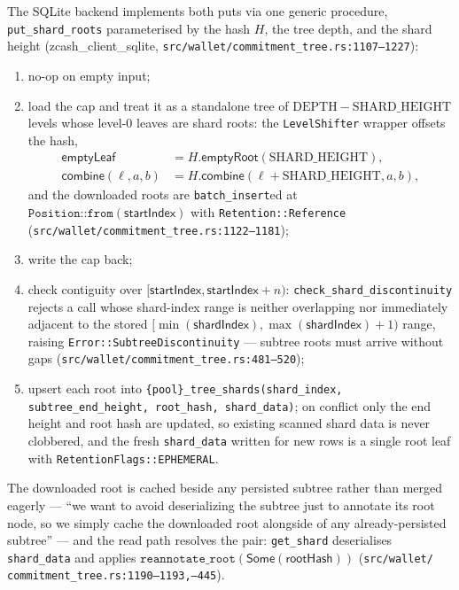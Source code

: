 \documentclass[11pt,a4paper]{article}
\theoremstyle{definition}
\begin{document}
The SQLite backend implements both puts via one generic procedure,
\texttt{put\_shard\_roots} parameterised by the hash $H$, the tree
depth, and the shard height
(\textsf{zcash\_client\_sqlite},
\texttt{src/wallet/}\allowbreak\texttt{commitment\_tree.rs:1107--1227}):
\begin{enumerate}[label=(\arabic*)]
\item no-op on empty input;
\item load the cap and treat it as a standalone tree of
  $\mathrm{DEPTH} - \mathrm{SHARD\_HEIGHT}$ levels whose level-$0$ leaves
  are shard roots: the \texttt{LevelShifter} wrapper offsets the hash,
  \[
  \begin{aligned}
  \mathsf{emptyLeaf} &= H.\mathsf{emptyRoot}(\mathrm{SHARD\_HEIGHT}), \\
  \mathsf{combine}(\ell, a, b) &=
    H.\mathsf{combine}(\ell + \mathrm{SHARD\_HEIGHT}, a, b),
  \end{aligned}
  \]
  and the downloaded roots are \texttt{batch\_insert}ed at
  $\texttt{Position::from}(\mathsf{startIndex})$ with
  \texttt{Retention::Reference}
  (\texttt{src/wallet/}\allowbreak\texttt{commitment\_tree.rs:1122--1181});
\item write the cap back;
\item check contiguity over
  $[\mathsf{startIndex}, \mathsf{startIndex} + n)$:
  \texttt{check\_shard\_discontinuity} rejects a call whose shard-index
  range is neither overlapping nor immediately adjacent to the stored
  $[\min(\mathsf{shardIndex}), \max(\mathsf{shardIndex}) + 1)$ range,
  raising \texttt{Error::SubtreeDiscontinuity} --- subtree roots must
  arrive without gaps
  (\texttt{src/wallet/}\allowbreak\texttt{commitment\_tree.rs:481--520});
\item upsert each root into
  \texttt{\{pool\}\_tree\_shards(shard\_index, subtree\_end\_height,
  root\_hash, shard\_data)}; on conflict only the end height and root
  hash are updated, so existing scanned shard data is never clobbered,
  and the fresh \texttt{shard\_data} written for new rows is a single
  root leaf with \texttt{RetentionFlags::EPHEMERAL}.
\end{enumerate}
The downloaded root is cached beside any persisted subtree rather than
merged eagerly --- ``we want to avoid deserializing the subtree just to
annotate its root node, so we simply cache the downloaded root alongside
of any already-persisted subtree'' --- and the read path resolves the
pair: \texttt{get\_shard} deserialises \texttt{shard\_data} and applies
$\texttt{reannotate\_root}(\mathsf{Some}(\mathsf{rootHash}))$
(\texttt{src/wallet/}\allowbreak
\texttt{commitment\_tree.rs:1190--1193,--445}).
\end{document}
